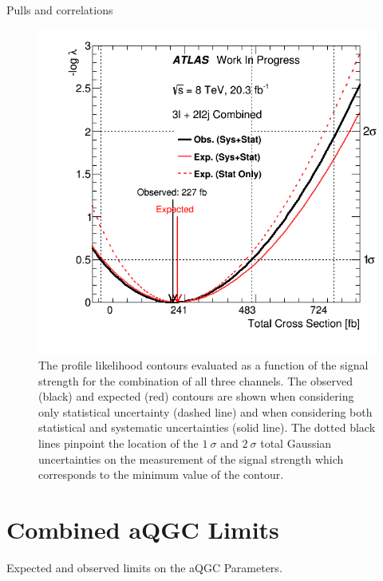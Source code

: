 Pulls and correlations

\begin{figure}[ht!]
\centering
\includegraphics[scale=0.7]{figures/combination/interval_comb.png}
\caption{The profile likelihood contours evaluated as a function of the signal strength
for the combination of all three channels. 
The observed (black) and expected (red) contours are shown when considering only statistical uncertainty (dashed line) and when considering both statistical and systematic uncertainties (solid line).
The dotted black
lines pinpoint the location of the $1~\sigma$ and $2~\sigma$ total Gaussian uncertainties
on the measurement of the signal strength which corresponds to the minimum value of the contour.}
\label{fig:stat_measurement_interval_combination}
\end{figure}








\section{Combined aQGC Limits}
\label{sec:combined_aqgc}


\begin{table}[h!]
  \begin{center}
  
    \caption{Expected and observed limits on the aQGC Parameters.}
    \label{tab:aqgc_combined_1d}

  \end{center}
\end{table}


